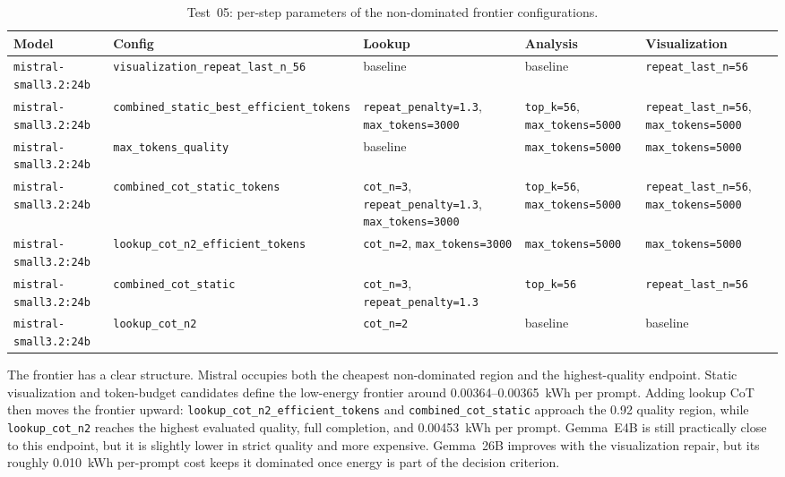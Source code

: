 \begin{table}[H]
\centering
{}
\small
\begin{tabular}{|Y{2.7cm}|Y{3.2cm}|Y{3cm}|Y{2.5cm}|Y{2.5cm}|}
\hline
{}
\textbf{Model} & \textbf{Config} & \textbf{Lookup} & \textbf{Analysis} & \textbf{Visualization} \T\B \\
\hline
\texttt{mistral-\allowbreak small3.2:24b} & \texttt{visualization\_repeat\_last\_n\_56} & baseline & baseline & \texttt{repeat\_last\_n=56} \T\B \\
\hline
\texttt{mistral-\allowbreak small3.2:24b} & \texttt{combined\_static\_best\_efficient\_tokens} & \texttt{repeat\_penalty=1.3}, \texttt{max\_tokens=3000} & \texttt{top\_k=56}, \texttt{max\_tokens=5000} & \texttt{repeat\_last\_n=56}, \texttt{max\_tokens=5000} \T\B \\
\hline
\texttt{mistral-\allowbreak small3.2:24b} & \texttt{max\_tokens\_quality} & baseline & \texttt{max\_tokens=5000} & \texttt{max\_tokens=5000} \T\B \\
\hline
\texttt{mistral-\allowbreak small3.2:24b} & \texttt{combined\_cot\_static\_tokens} & \texttt{cot\_n=3}, \texttt{repeat\_penalty=1.3}, \texttt{max\_tokens=3000} & \texttt{top\_k=56}, \texttt{max\_tokens=5000} & \texttt{repeat\_last\_n=56}, \texttt{max\_tokens=5000} \T\B \\
\hline
\texttt{mistral-\allowbreak small3.2:24b} & \texttt{lookup\_cot\_n2\_\allowbreak efficient\_tokens} & \texttt{cot\_n=2}, \texttt{max\_tokens=3000} & \texttt{max\_tokens=5000} & \texttt{max\_tokens=5000} \T\B \\
\hline
\texttt{mistral-\allowbreak small3.2:24b} & \texttt{combined\_cot\_static} & \texttt{cot\_n=3}, \texttt{repeat\_penalty=1.3} & \texttt{top\_k=56} & \texttt{repeat\_last\_n=56} \T\B \\
\hline
\texttt{mistral-\allowbreak small3.2:24b} & \texttt{lookup\_cot\_n2} & \texttt{cot\_n=2} & baseline & baseline \T\B \\
\hline
\end{tabular}
\caption{Test~05: per-step parameters of the non-dominated frontier configurations.}
\label{tab:test05paretoparams}
\end{table}

The frontier has a clear structure. Mistral occupies both the cheapest
non-dominated region and the highest-quality endpoint. Static visualization
and token-budget candidates define the low-energy frontier around
0.00364--0.00365~kWh per prompt. Adding lookup CoT then moves the frontier
upward: \texttt{lookup\_cot\_n2\_\allowbreak efficient\_tokens} and
\texttt{combined\_cot\_static} approach the 0.92 quality region, while
\texttt{lookup\_cot\_n2} reaches the highest evaluated quality, full
completion, and 0.00453~kWh per prompt. Gemma~E4B is still practically close
to this endpoint, but it is slightly lower in strict quality and more
expensive. Gemma~26B improves with the visualization repair, but its roughly
0.010~kWh per-prompt cost keeps it dominated once energy is part of the
decision criterion.

